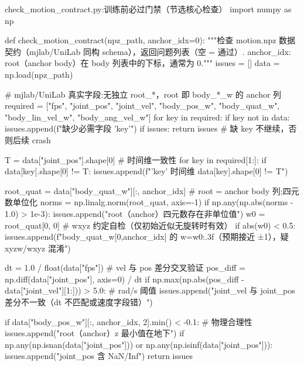 \begin{codebox}[Python]{check\_motion\_contract.py:训练前必过门禁（节选核心检查）}
import numpy as np

def check_motion_contract(npz_path, anchor_idx=0):
    """检查 motion.npz 数据契约（mjlab/UniLab 同构 schema），返回问题列表（空 = 通过）.
    anchor_idx: root（anchor body）在 body 列表中的下标，通常为 0."""
    issues = []
    data = np.load(npz_path)

    # mjlab/UniLab 真实字段:无独立 root_*，root 即 body_*_w 的 anchor 列
    required = ["fps", "joint_pos", "joint_vel",
                "body_pos_w", "body_quat_w", "body_lin_vel_w", "body_ang_vel_w"]
    for key in required:
        if key not in data:
            issues.append(f"缺少必需字段 '{key}'")
    if issues:
        return issues                               # 缺 key 不继续，否则后续 crash

    T = data["joint_pos"].shape[0]                   # 时间维一致性
    for key in required[1:]:
        if data[key].shape[0] != T:
            issues.append(f"'{key}' 时间维 {data[key].shape[0]} != {T}")

    root_quat = data["body_quat_w"][:, anchor_idx]   # root = anchor body 列;四元数单位化
    norms = np.linalg.norm(root_quat, axis=-1)
    if np.any(np.abs(norms - 1.0) > 1e-3):
        issues.append("root（anchor）四元数存在非单位值")
    w0 = root_quat[0, 0]                             # wxyz 约定自检（仅初始近似无旋转时有效）
    if abs(w0) < 0.5:
        issues.append(f"body_quat_w[0,{anchor_idx}] 的 w={w0:.3f}（预期接近 ±1），疑 xyzw/wxyz 混淆")

    dt = 1.0 / float(data["fps"])                    # vel 与 pos 差分交叉验证
    pos_diff = np.diff(data["joint_pos"], axis=0) / dt
    if np.max(np.abs(pos_diff - data["joint_vel"][1:])) > 5.0:   # rad/s 阈值
        issues.append("joint_vel 与 joint_pos 差分不一致（dt 不匹配或速度字段错）")

    if data["body_pos_w"][:, anchor_idx, 2].min() < -0.1:   # 物理合理性
        issues.append("root（anchor）z 最小值在地下")
    if np.any(np.isnan(data["joint_pos"])) or np.any(np.isinf(data["joint_pos"])):
        issues.append("joint_pos 含 NaN/Inf")
    return issues
\end{codebox}


